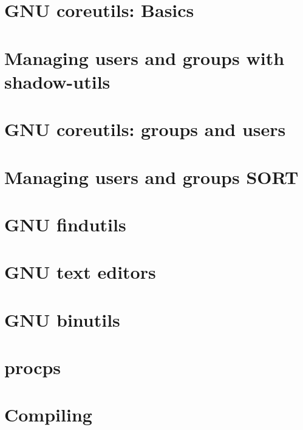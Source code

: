 \documentclass[oneside]{book}
\begin{document}
\part{GNU coreutils: Basics}















\part{Managing users and groups with shadow-utils}




\part{GNU coreutils: groups and users}


\part{Managing users and groups SORT}



\part{GNU findutils}


\part{GNU text editors}



\part{GNU binutils}


\part{procps}


\part{Compiling}




\end{document}
